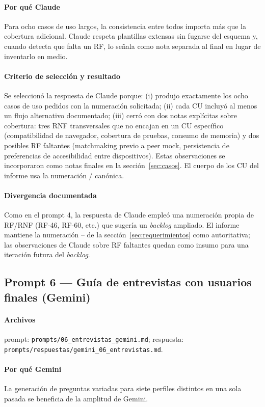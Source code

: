 \paragraph{Por qué Claude} Para ocho casos de uso largos, la
consistencia entre todos importa más que la cobertura adicional.
Claude respeta plantillas extensas sin fugarse del esquema y, cuando
detecta que falta un RF, lo señala como nota separada al final en
lugar de inventarlo en medio.

\paragraph{Criterio de selección y resultado} Se seleccionó la
respuesta de Claude porque: (i) produjo exactamente los ocho casos de
uso pedidos con la numeración solicitada; (ii) cada CU incluyó al
menos un flujo alternativo documentado; (iii) cerró con dos notas
explícitas sobre cobertura: tres RNF transversales que no encajan en
un CU específico (compatibilidad de navegador, cobertura de pruebas,
consumo de memoria) y dos posibles RF faltantes (matchmaking previo a
peer mock, persistencia de preferencias de accesibilidad entre
dispositivos). Estas observaciones se incorporaron como notas finales
en la sección~\ref{sec:casos}. El cuerpo de los CU del informe usa la
numeración \rf{}/\rnf{} canónica.

\paragraph{Divergencia documentada} Como en el prompt 4, la respuesta
de Claude empleó una numeración propia de RF/RNF (RF-46, RF-60, etc.)
que sugería un \textit{backlog} ampliado. El informe mantiene la
numeración -- de la sección~\ref{sec:requerimientos}
como autoritativa; las observaciones de Claude sobre RF faltantes
quedan como insumo para una iteración futura del \textit{backlog}.

\subsection{Prompt 6 --- Guía de entrevistas con usuarios finales (Gemini)}
\paragraph{Archivos} prompt:
\texttt{prompts/06\_entrevistas\_gemini.md}; respuesta:
\texttt{prompts/respuestas/gemini\_06\_entrevistas.md}.

\paragraph{Por qué Gemini} La generación de preguntas variadas para
siete perfiles distintos en una sola pasada se beneficia de la
amplitud de Gemini.

